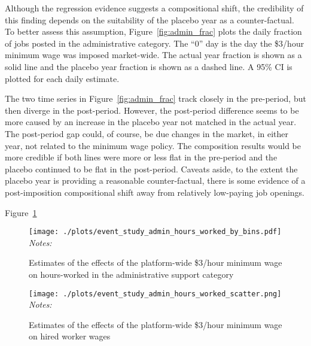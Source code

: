 Although the regression evidence suggests a compositional shift, the credibility of this finding depends on the suitability of the placebo year as a counter-factual.
To better assess this assumption, Figure~\ref{fig:admin_frac} plots the daily fraction of jobs posted in the administrative category.
The ``0'' day is the day the \$3/hour minimum wage was imposed market-wide. 
The actual year fraction is shown as a solid line and the placebo year fraction is shown as a dashed line. 
A 95\% CI is plotted for each daily estimate.

The two time series in Figure~\ref{fig:admin_frac} track closely in the pre-period, but then diverge in the post-period.
However, the post-period difference seems to be more caused by an increase in the placebo year not matched in the actual year.
The post-period gap could, of course, be due changes in the market, in either year, not related to the minimum wage policy.
The composition results would be more credible if both lines were more or less flat in the pre-period and the placebo continued to be flat in the post-period.
Caveats aside, to the extent the placebo year is providing a reasonable counter-factual, there is some evidence of a post-imposition compositional shift away from relatively low-paying job openings. 

Figure~\ref{fig:event_study_admin_hours_worked_by_bins}

\begin{figure}[h!]
\centering 
\caption{Estimates of the effects of the platform-wide \$3/hour minimum wage on hours-worked in the administrative support category} \label{fig:event_study_admin_hours_worked_by_bins} 
\begin{minipage}{0.90 \linewidth}
\texttt{[image: ./plots/event\_study\_admin\_hours\_worked\_by\_bins.pdf]} 
{\footnotesize
  \emph{Notes:}
}
\end{minipage} 
\end{figure} 


\begin{figure}[h!]
\centering 
\caption{Estimates of the effects of the platform-wide \$3/hour minimum wage on hired worker wages} \label{fig:event_study_admin_hours_worked_scatter} 
\begin{minipage}{0.90 \linewidth}
\texttt{[image: ./plots/event\_study\_admin\_hours\_worked\_scatter.png]} 
{\footnotesize
  \emph{Notes:}
}
\end{minipage} 
\end{figure} 



